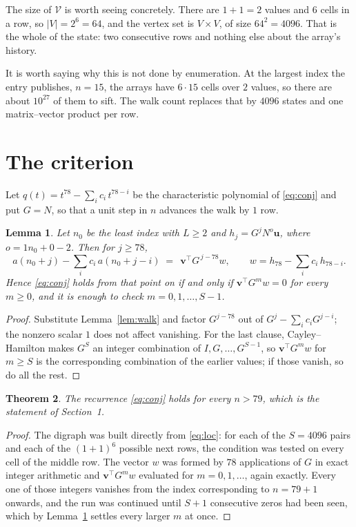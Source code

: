 \documentclass[11pt,a4paper]{article}
\theoremstyle{plain}
\newtheorem{theorem}{Theorem}
\newtheorem{lemma}[theorem]{Lemma}
\theoremstyle{definition}
\begin{document}
The size of $\mathcal V$ is worth seeing concretely. There are $1+1=2$ values
and $6$ cells in a row, so $|V|=2^{6}=64$, and the vertex set is
$V\times V$, of size $64^2=4096$. That is the whole of the state: two consecutive
rows and nothing else about the array's history.

It is worth saying why this is not done by enumeration. At the largest index the entry
publishes, $n=15$, the arrays have $6\cdot15$ cells over
$2$ values, so there are about $10^{27}$ of them to sift. The
walk count replaces that by $4096$ states and one matrix--vector product per row.
\section{The criterion}

Let $q(t)=t^{78}-\sum_i c_i\,t^{78-i}$ be the characteristic polynomial of
\eqref{eq:conj} and put $G=N$, so that a unit step in $n$ advances the walk by
$1$ row.

\begin{lemma}\label{lem:crit}
Let $n_0$ be the least index with $L\ge2$ and $h_j=G^{j}N^{o}\mathbf{u}$, where
$o=1n_0+0-2$. Then for $j\ge78$,
\[
a(n_0+j)-\sum_i c_i\,a(n_0+j-i)\;=\;\,\mathbf{v}^{\!\top}G^{\,j-78}w,
\qquad w=h_{78}-\sum_i c_i\,h_{78-i} .
\]
Hence \eqref{eq:conj} holds from that point on if and only if
$\mathbf{v}^{\!\top}G^{m}w=0$ for every $m\ge0$, and it is enough to check
$m=0,1,\dots,S-1$.
\end{lemma}

\begin{proof}
Substitute Lemma~\ref{lem:walk} and factor $G^{j-78}$ out of
$G^{j}-\sum_ic_iG^{j-i}$; the nonzero scalar $1$ does not affect
vanishing. For the last clause, Cayley--Hamilton makes $G^{S}$ an integer combination of
$I,G,\dots,G^{S-1}$, so $\mathbf{v}^{\!\top}G^{m}w$ for $m\ge S$ is the corresponding
combination of the earlier values; if those vanish, so do all the rest.
\end{proof}

\begin{theorem}
The recurrence \eqref{eq:conj} holds for every $n>79$, which is the statement of
Section~1.
\end{theorem}

\begin{proof}
The digraph was built directly from \eqref{eq:loc}: for each of the $S=4096$ pairs and each
of the $(1+1)^{6}$ possible next rows, the condition was tested on every cell of
the middle row. The vector $w$ was formed by $78$ applications of $G$ in exact integer
arithmetic and $\mathbf{v}^{\!\top}G^{m}w$ evaluated for $m=0,1,\dots$, again exactly.
Every one of those integers vanishes from the index corresponding to $n=79+1$ onwards,
and the run was continued until $S+1$ consecutive zeros had been seen, which by
Lemma~\ref{lem:crit} settles every larger $m$ at once.
\end{proof}
\end{document}
